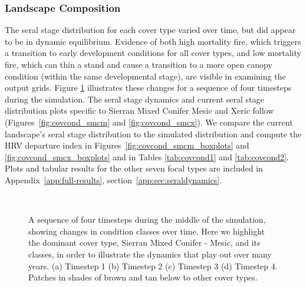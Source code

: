 \subsubsection{Landscape Composition} 

The seral stage distribution for each cover type varied over time, but did appear to be in dynamic equilibrium. Evidence of both high mortality fire, which triggers a transition to early development conditions for all cover types, and low mortality fire, which can thin a stand and cause a transition to a more open canopy condition (within the same developmental stage), are visible in examining the output grids. Figure \ref{fig:covcondmaps} illustrates these changes for a sequence of four timesteps during the simulation. The seral stage dynamics and current seral stage distribution plots specific to Sierran Mixed Conifer Mesic and Xeric follow (Figures~\ref{fig:covcond_smcm} and \ref{fig:covcond_smcx}).  We compare the current landscape's seral stage distribution to the simulated distribution and compute the HRV departure index in Figures~\ref{fig:covcond_smcm_boxplots} and \ref{fig:covcond_smcx_boxplots} and in Tables \ref{tab:covcond1} and \ref{tab:covcond2}. Plots and tabular results for the other seven focal types are included in Appendix~\ref{app:full-results}, section~\ref{app:sec:seraldynamics}.

\begin{figure}[!htbp]
  \centering
  \\%
  \caption{A sequence of four timesteps during the middle of the simulation, showing changes in condition classes over time. Here we highlight the dominant cover type, Sierran Mixed Conifer - Mesic, and its classes, in order to illustrate the dynamics that play out over many years. (a) Timestep 1 (b) Timestep 2 (c) Timestep 3 (d) Timestep 4. Patches in shades of brown and tan below to other cover types.}
  \label{fig:covcondmaps}
\end{figure}



